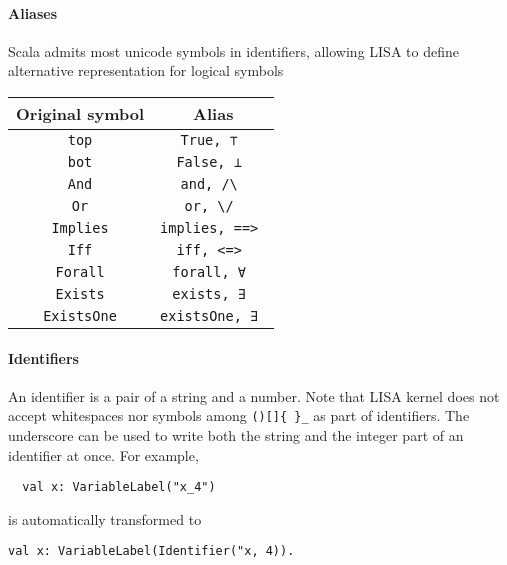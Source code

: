 \paragraph{Aliases}
Scala admits most unicode symbols in identifiers, allowing LISA to define alternative representation for logical symbols
\begin{center}
\begin{tabular}{| c | c |}

  \hline
  Original symbol & Alias \\
  \hline
  
  \lstinline|top| & \lstinline|True, ⊤ |  \\ \hline
  \lstinline|bot| & \lstinline|False, ⊥ |  \\ \hline
  \lstinline|And| & \lstinline|and, /\ |  \\ \hline
  \lstinline|Or| & \lstinline|or, \/ |  \\ \hline
  \lstinline|Implies| & \lstinline|implies, ==> |  \\ \hline
  \lstinline|Iff| & \lstinline|iff, <=> |  \\ \hline
  \lstinline|Forall| & \lstinline|forall, ∀ |  \\ \hline
  \lstinline|Exists| & \lstinline|exists, ∃ |  \\ \hline
  \lstinline|ExistsOne| & \lstinline|existsOne, ∃ |  \\ \hline
  
\end{tabular}
\end{center}
\paragraph{Identifiers}
An identifier is a pair of a string and a number. Note that LISA kernel does not accept whitespaces nor symbols among \lstinline|()[]{ }_| as part of identifiers. The underscore can be used to write both the string and the integer part of an identifier at once. For example, 

\begin{lstlisting}
  val x: VariableLabel("x_4")
\end{lstlisting}

is automatically transformed to 

\begin{lstlisting}
val x: VariableLabel(Identifier("x, 4)).
\end{lstlisting}

